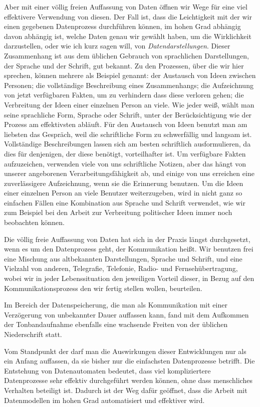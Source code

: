 {Aber mit einer völlig freien Auffassung von Daten öffnen wir Wege für eine viel effektivere Verwendung von diesen. Der Fall ist, dass die Leichtigkeit mit der wir einen gegebenen Datenprozess durchführen können, im hohen Grad abhängig davon abhängig ist, welche Daten genau wir gewählt haben, um die Wirklichkeit darzustellen, oder wie ich kurz sagen will, von \emph{Datendarstellungen}. Dieser Zusammenhang ist aus dem üblichen Gebrauch von sprachlichen Darstellungen, der Sprache und der Schrift, gut bekannt. Zu den Prozessen, über die wir hier sprechen, können mehrere als Beispiel  genannt: der Austausch von Ideen zwischen Personen; die vollständige Beschreibung eines Zusammenhangs; die Aufzeichnung von jetzt verfügbaren Fakten, um zu verhindern dass diese verloren gehen; die Verbreitung der Ideen einer einzelnen Person an viele. Wie jeder weiß, wählt man seine sprachliche Form, Sprache oder Schrift, unter der Berücksichtigung wie der Prozess am effektivsten abläuft. Für den Austausch von Ideen benutzt man am liebsten das Gespräch, weil die schriftliche Form zu schwerfällig und langsam ist. Vollständige Beschreibungen lassen sich am besten schriftlich ausformulieren, da dies für denjenigen, der diese benötigt, vorteilhafter ist. Um verfügbare Fakten aufzuzeichen, verwenden viele von uns schriftliche Notizen, aber das hängt von unserer angeborenen Verarbeitungsfähigkeit ab, und einige von uns erreichen eine zuverlässigere Aufzeichnung, wenn sie die Erinnerung benutzen. Um die Ideen einer einzelnen Person an viele Benutzer weiterzugeben, wird in nicht ganz so einfachen Fällen eine Kombination aus Sprache und Schrift verwendet, wie wir zum Beispiel bei den Arbeit zur Verbreitung politischer Ideen immer noch beobachten können.

Die völlig freie Auffassung von Daten hat sich in der Praxis längst durchgesetzt, wenn es um den Datenprozess geht, der Kommunikation heißt. Wir benutzen frei eine Mischung aus altbekannten Darstellungen, Sprache und Schrift, und eine Vielzahl von anderen, Telegrafie, Telefonie, Radio- und Fernsehübertragung, wobei wir in jeder Lebenssituation den jeweiligen Vorteil dieser, in Bezug auf den Kommunikationsprozess den wir fertig stellen wollen, beurteilen. 

Im Bereich der Datenspeicherung, die man als Kommunikation mit einer Verzögerung von unbekannter Dauer auffassen kann, fand mit dem Aufkommen der Tonbandaufnahme ebenfalls eine wachsende Freiten von der üblichen Niederschrift statt.

Vom Standpunkt der  darf man die Auswirkungen dieser Entwicklungen nur als ein Anfang auffassen, da sie bisher nur die einfachsten Datenprozesse betrifft. Die Entstehung von Datenautomaten bedeutet, dass viel kompliziertere Datenprozesse sehr effektiv durchgeführt werden können, ohne dass menschliches Verhalten beteiligt ist.  Dadurch ist der Weg dafür geöffnet, dass die Arbeit mit Datenmodellen im hohen Grad automatisiert und effektiver wird.
}

